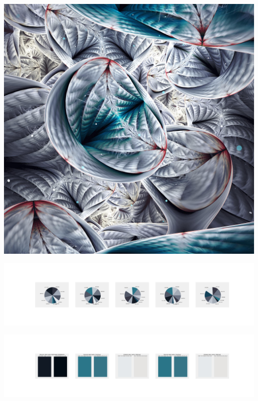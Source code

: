 \documentclass[11pt]{article}
\begin{document}
\begin{landscape}
    \begin{center}
    \includegraphics[width=\textwidth]{./nbimg/file (407).jpg}
    \end{center}

    \begin{center}
    \includegraphics[width=250mm]{./nbimg/pie-342.jpg}
    \end{center}

    \begin{center}
    \includegraphics[width=250mm]{./nbimg/peak-342.jpg}
    \end{center}
    


\end{landscape}
\end{document}
